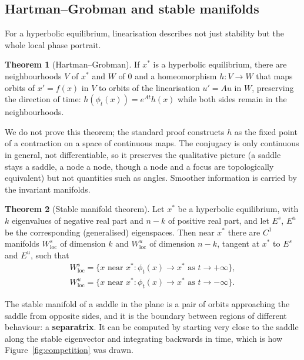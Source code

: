 \documentclass[11pt,a4paper]{article}
\numberwithin{equation}{section}
\theoremstyle{definition}
\newtheorem{thm}{Theorem}[subsection]
\begin{document}
\subsection{Hartman--Grobman and stable manifolds}
\label{ssec:hartman}

For a hyperbolic equilibrium, linearisation describes not just stability but the whole local phase portrait.

\begin{thm}[Hartman--Grobman]
\label{thm:hartman}
If $x^*$ is a hyperbolic equilibrium, there are neighbourhoods $V$ of $x^*$ and $W$ of $0$ and a homeomorphism $h\colon V \to W$ that maps orbits of $x' = f(x)$ in $V$ to orbits of the linearisation $u' = Au$ in $W$,
preserving the direction of time: $h(\phi_t(x)) = e^{At}h(x)$ while both sides remain in the neighbourhoods.
\end{thm}

We do not prove this theorem; the standard proof constructs $h$ as the fixed point of a contraction on a space of continuous maps. The conjugacy is only continuous in general, not
differentiable, so it preserves the qualitative picture (a saddle stays a saddle, a node a node, though a node and a focus are topologically equivalent) but not quantities such as angles.
Smoother information is carried by the invariant manifolds.

\begin{thm}[Stable manifold theorem]
\label{thm:stablemfd}
Let $x^*$ be a hyperbolic equilibrium, with $k$ eigenvalues of negative real part and $n - k$ of positive real part, and let $E^s$, $E^u$ be the corresponding (generalised) eigenspaces. Then
near $x^*$ there are $C^1$ manifolds $W^s_{\mathrm{loc}}$ of dimension $k$ and $W^u_{\mathrm{loc}}$ of dimension $n - k$, tangent at $x^*$ to $E^s$ and $E^u$, such that
\begin{gather*}
W^s_{\mathrm{loc}} = \{x \text{ near } x^* : \phi_t(x) \to x^* \text{ as } t \to +\infty\},\\
W^u_{\mathrm{loc}} = \{x \text{ near } x^* : \phi_t(x) \to x^* \text{ as } t \to -\infty\} .
\end{gather*}
\end{thm}

The stable manifold of a saddle in the plane is a pair of orbits approaching the saddle from opposite sides, and it is the boundary between regions of different behaviour: a
\textbf{separatrix}. It can be computed by starting very close to the saddle along the stable eigenvector and integrating backwards in time, which is how Figure~\ref{fig:competition} was drawn.
\end{document}
